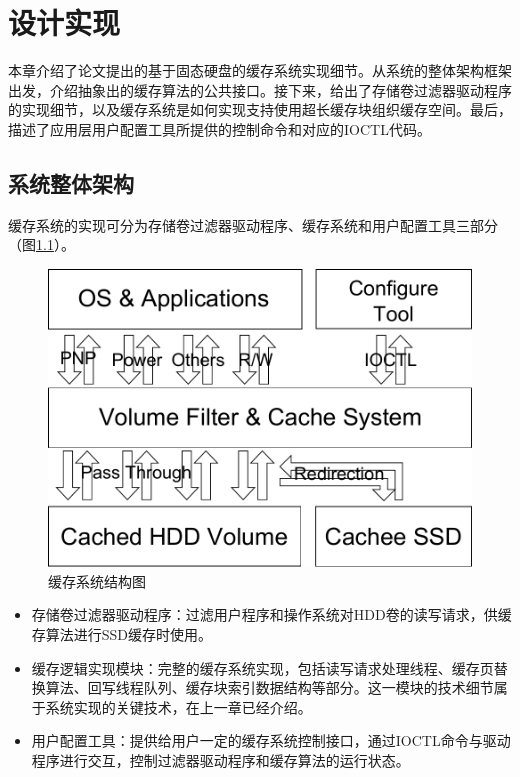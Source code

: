 
\chapter{设计实现}
\label{cha:mainmatter}

本章介绍了论文提出的基于固态硬盘的缓存系统实现细节。从系统的整体架构框架出发，介绍抽象出的缓存算法的公共接口。接下来，给出了存储卷过滤器驱动程序的实现细节，以及缓存系统是如何实现支持使用超长缓存块组织缓存空间。最后，描述了应用层用户配置工具所提供的控制命令和对应的IOCTL代码。

\section{系统整体架构}
\label{sec:system_overview}

缓存系统的实现可分为存储卷过滤器驱动程序、缓存系统和用户配置工具三部分（图\ref{fig:sys-overview}）。

\begin{figure}[!ht]
\centering
\includegraphics[width=0.6\linewidth]{./graph/sys-overview}
\caption{缓存系统结构图}
\label{fig:sys-overview}
\end{figure}

\begin{itemize}
\item
存储卷过滤器驱动程序：过滤用户程序和操作系统对HDD卷的读写请求，供缓存算法进行SSD缓存时使用。
\item
缓存逻辑实现模块：完整的缓存系统实现，包括读写请求处理线程、缓存页替换算法、回写线程队列、缓存块索引数据结构等部分。这一模块的技术细节属于系统实现的关键技术，在上一章已经介绍。
\item
用户配置工具：提供给用户一定的缓存系统控制接口，通过IOCTL命令与驱动程序进行交互，控制过滤器驱动程序和缓存算法的运行状态。
\end{itemize}


